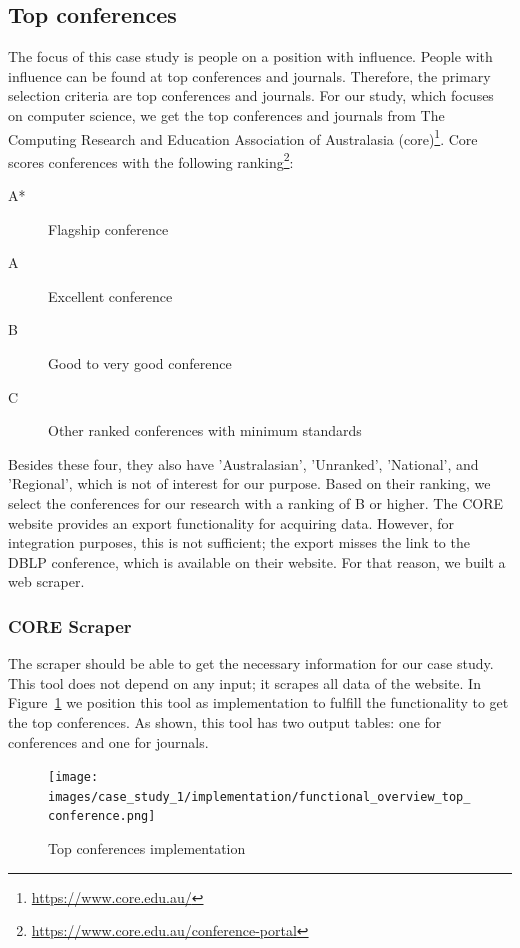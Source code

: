 \documentclass{ou-report}
\newcommand{\dblp}{DBLP}
\begin{document}
\subsection{Top conferences}
The focus of this case study is people on a position with influence.
People with influence can be found at top conferences and journals.
Therefore, the primary selection criteria are top conferences and journals.
For our study, which focuses on computer science, we get the top conferences 
and journals from The Computing Research and Education Association of 
Australasia (core)\footnote{\url{https://www.core.edu.au/}}.
Core scores conferences with the following
ranking\footnote{\url{https://www.core.edu.au/conference-portal}}:
\begin{description}
    \item[A*] Flagship conference
    \item[A] Excellent conference
    \item[B] Good to very good conference
    \item[C] Other ranked conferences with minimum standards
\end{description}
Besides these four, they also have 'Australasian', 'Unranked', 'National', and 
'Regional', which is not of interest for our purpose.
Based on their ranking, we select the conferences for our 
research with a ranking of B or higher.
The CORE website provides an export functionality for acquiring data. However, 
for integration purposes, this is not sufficient; the export misses the link to 
the \dblp{} conference, which is available on their website. For that reason, we 
built a web scraper.

\subsubsection{CORE Scraper}
The scraper should be able to get the necessary information for our case 
study.
This tool does not depend on any input; it scrapes all data of the website.
In Figure~\ref{fig:functional_overview_top_conferences} we position this tool as 
implementation to
fulfill the functionality to get the top conferences. As shown, this tool has two
output tables: one for conferences and one for journals.

\begin{figure}[H]
    \centering
    \texttt{[image: images/case\_study\_1/implementation/functional\_overview\_top\_conference.png]}
    \caption{Top conferences implementation}
    \label{fig:functional_overview_top_conferences}
\end{figure}
\end{document}
